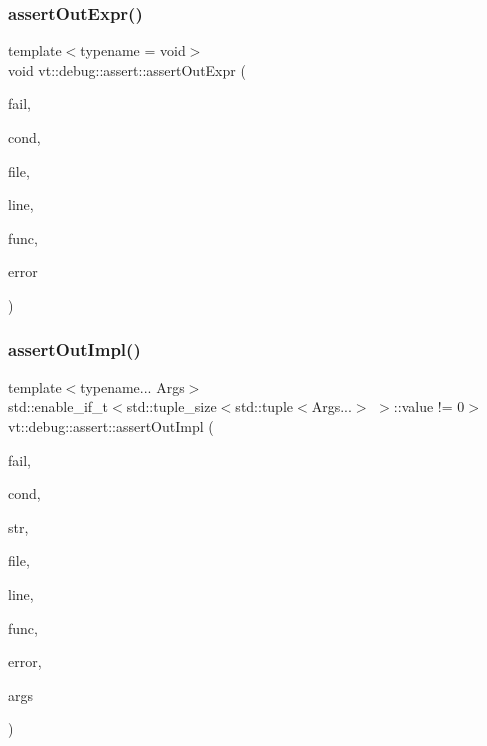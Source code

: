 \mbox{\label{namespacevt_1_1debug_1_1assert_ad28250da4c859ea57caf834fcb3e125f}} 
\subsubsection{\texorpdfstring{assert\+Out\+Expr()}{assertOutExpr()}}
{\footnotesize\ttfamily template$<$typename  = void$>$ \\
void vt\+::debug\+::assert\+::assert\+Out\+Expr (\begin{DoxyParamCaption}\item[{bool}]{fail,  }\item[{std\+::string const}]{cond,  }\item[{std\+::string const \&}]{file,  }\item[{int const}]{line,  }\item[{std\+::string const \&}]{func,  }\item[{\hyperlink{namespacevt_a793764d753923abc3d32929870beb485}{Error\+Code\+Type}}]{error }\end{DoxyParamCaption})\hspace{0.3cm}{\ttfamily [inline]}}

\mbox{\label{namespacevt_1_1debug_1_1assert_adcb1f71720f5961b3a6430416e95eb6b}} 
\subsubsection{\texorpdfstring{assert\+Out\+Impl()}{assertOutImpl()}}
{\footnotesize\ttfamily template$<$typename... Args$>$ \\
std\+::enable\+\_\+if\+\_\+t$<$std\+::tuple\+\_\+size$<$std\+::tuple$<$Args...$>$ $>$\+::value != 0$>$ vt\+::debug\+::assert\+::assert\+Out\+Impl (\begin{DoxyParamCaption}\item[{bool}]{fail,  }\item[{std\+::string const}]{cond,  }\item[{std\+::string const \&}]{str,  }\item[{std\+::string const \&}]{file,  }\item[{int const}]{line,  }\item[{std\+::string const \&}]{func,  }\item[{\hyperlink{namespacevt_a793764d753923abc3d32929870beb485}{Error\+Code\+Type}}]{error,  }\item[{Args \&\&...}]{args }\end{DoxyParamCaption})\hspace{0.3cm}{\ttfamily [inline]}}

